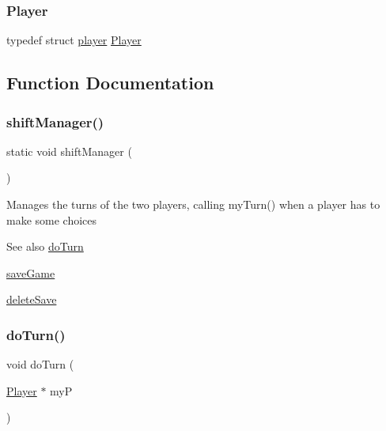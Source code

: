 \subsubsection{\texorpdfstring{Player}{Player}}
{\footnotesize\ttfamily typedef struct \hyperlink{structplayer}{player}  \hyperlink{group__game_gac6f795d0d2e88ee469ddc704329e7cc3}{Player}}



\subsection{Function Documentation}
\mbox{\label{group__game_ga96997515bdc703f69dbb3df24d8342a7}} 
\subsubsection{\texorpdfstring{shift\+Manager()}{shiftManager()}}
{\footnotesize\ttfamily static void shift\+Manager (\begin{DoxyParamCaption}{ }\end{DoxyParamCaption})\hspace{0.3cm}{\ttfamily [static]}}

Manages the turns of the two players, calling my\+Turn() when a player has to make some choices \begin{DoxySeeAlso}{See also}
\hyperlink{group__game_gaf21601075374fa679f09cafa941b41ed}{do\+Turn} 

\hyperlink{group__system_gac42f6d85eb40dfdfadbf9933d885b4c1}{save\+Game} 

\hyperlink{group__system_ga64ff5e40fc2d7ff1139ef10c5598f123}{delete\+Save} 
\end{DoxySeeAlso}
\mbox{\label{group__game_gaf21601075374fa679f09cafa941b41ed}} 
\subsubsection{\texorpdfstring{do\+Turn()}{doTurn()}}
{\footnotesize\ttfamily void do\+Turn (\begin{DoxyParamCaption}\item[{\hyperlink{group__game_gac6f795d0d2e88ee469ddc704329e7cc3}{Player} $\ast$}]{myP }\end{DoxyParamCaption})\hspace{0.3cm}{\ttfamily [static]}}

